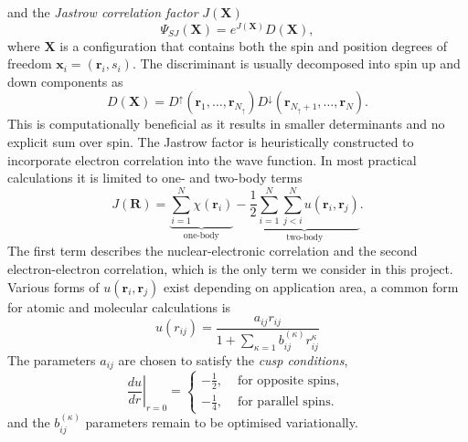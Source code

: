 \documentclass[final,3p,times,twocolumn]{elsarticle}
\begin{document}
	and the \emph{Jastrow correlation factor} $J(\mathbf{X})$
	\begin{equation}
		\Psi_{SJ}(\mathbf{X})=e^{J(\mathbf{X})} D(\mathbf{X}),
	\end{equation}
	where $\mathbf{X}$ is a configuration that contains both the spin and position degrees of freedom $\mathbf{x}_i = (\mathbf{r}_i, s_i)$. The discriminant is usually decomposed into spin up and down components as
	\begin{equation}
		D(\mathbf{X}) = D^{\uparrow}\left(\mathbf{r}_{1}, \ldots, \mathbf{r}_{N_{\uparrow}}\right) D^{\downarrow}\left(\mathbf{r}_{N_{\uparrow}+1}, \ldots, \mathbf{r}_{N}\right).
	\end{equation}
	This is computationally beneficial as it results in smaller determinants and no explicit sum over spin.
	The Jastrow factor is heuristically constructed to incorporate electron correlation into the wave function. In most practical calculations it is limited to one- and two-body terms~\cite{foulkes2001quantum}
	\begin{equation}
		\label{eq:jast}
		J(\mathbf{R})=
		\underbrace{\sum_{i=1}^{N} \chi\left(\mathbf{r}_{i}\right)}_{\text{one-body}}
		-
		\underbrace{\frac{1}{2} \sum_{i=1}^{N} \sum_{j<i}^{N} u\left(\mathbf{r}_{i}, \mathbf{r}_{j}\right)}_{\text{two-body}}.
	\end{equation}
	The first term describes the nuclear-electronic correlation and the second electron-electron correlation, which is the only term we consider in this project.
	Various forms of $u(\mathbf{r}_{i}, \mathbf{r}_{j})$ exist depending on application area, a common form for atomic and molecular calculations is
	\begin{equation}
		\label{eq:u}
		u(r_{ij})=\frac{a_{ij} r_{ij}}{1+\sum_{\kappa=1} b^{(\kappa)}_{ij} r^\kappa_{ij}}
	\end{equation}
	The parameters $a_{ij}$ are chosen to satisfy the \emph{cusp conditions},  
	\begin{equation}
		\left.\frac{d u}{d r}\right|_{r=0}=\left\{\begin{array}{cl}-\frac{1}{2}, & \text { for opposite spins, } \\ -\frac{1}{4}, & \text { for parallel spins. }\end{array}\right.
	\end{equation}
	and the $b^{(\kappa)}_{ij}$ parameters remain to be optimised variationally. 
	
\end{document}
